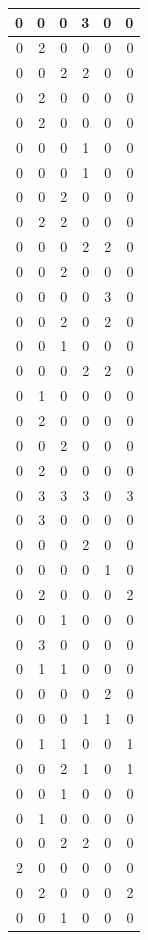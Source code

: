 \documentclass[
]{article}
\begin{document}
\begin{tabular}{r|r|r|r|r|r}
\hline
0 & 0 & 0 & 3 & 0 & 0\\
\hline
0 & 2 & 0 & 0 & 0 & 0\\
\hline
0 & 0 & 2 & 2 & 0 & 0\\
\hline
0 & 2 & 0 & 0 & 0 & 0\\
\hline
0 & 2 & 0 & 0 & 0 & 0\\
\hline
0 & 0 & 0 & 1 & 0 & 0\\
\hline
0 & 0 & 0 & 1 & 0 & 0\\
\hline
0 & 0 & 2 & 0 & 0 & 0\\
\hline
0 & 2 & 2 & 0 & 0 & 0\\
\hline
0 & 0 & 0 & 2 & 2 & 0\\
\hline
0 & 0 & 2 & 0 & 0 & 0\\
\hline
0 & 0 & 0 & 0 & 3 & 0\\
\hline
0 & 0 & 2 & 0 & 2 & 0\\
\hline
0 & 0 & 1 & 0 & 0 & 0\\
\hline
0 & 0 & 0 & 2 & 2 & 0\\
\hline
0 & 1 & 0 & 0 & 0 & 0\\
\hline
0 & 2 & 0 & 0 & 0 & 0\\
\hline
0 & 0 & 2 & 0 & 0 & 0\\
\hline
0 & 2 & 0 & 0 & 0 & 0\\
\hline
0 & 3 & 3 & 3 & 0 & 3\\
\hline
0 & 3 & 0 & 0 & 0 & 0\\
\hline
0 & 0 & 0 & 2 & 0 & 0\\
\hline
0 & 0 & 0 & 0 & 1 & 0\\
\hline
0 & 2 & 0 & 0 & 0 & 2\\
\hline
0 & 0 & 1 & 0 & 0 & 0\\
\hline
0 & 3 & 0 & 0 & 0 & 0\\
\hline
0 & 1 & 1 & 0 & 0 & 0\\
\hline
0 & 0 & 0 & 0 & 2 & 0\\
\hline
0 & 0 & 0 & 1 & 1 & 0\\
\hline
0 & 1 & 1 & 0 & 0 & 1\\
\hline
0 & 0 & 2 & 1 & 0 & 1\\
\hline
0 & 0 & 1 & 0 & 0 & 0\\
\hline
0 & 1 & 0 & 0 & 0 & 0\\
\hline
0 & 0 & 2 & 2 & 0 & 0\\
\hline
2 & 0 & 0 & 0 & 0 & 0\\
\hline
0 & 2 & 0 & 0 & 0 & 2\\
\hline
0 & 0 & 1 & 0 & 0 & 0\\

\end{tabular}
\end{document}
